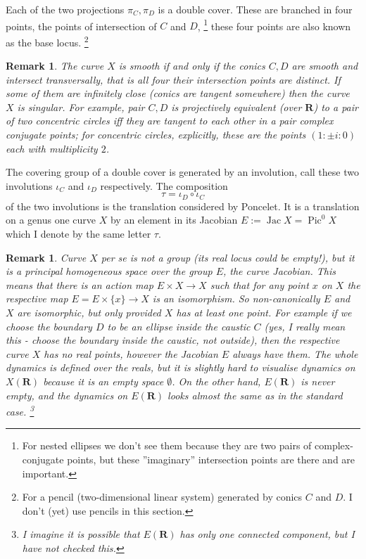 \documentclass[12pt]{article}
\numberwithin{equation}{section}
\newtheorem{remark}[dummy]{Remark}           %
\newcommand\R{\mathbf{R}}                    %
\DeclareMathOperator\Jac{Jac}		     %
\DeclareMathOperator\Pic{Pic}                %
\begin{document}
Each of the two projections $π_C,π_D$ is a double cover.
These are branched in four points,
the points of intersection of $C$ and $D$,
\footnote{For nested ellipses we don’t see them
because they are two pairs of complex-conjugate points,
but these ''imaginary'' intersection points are there and are important.}
these four points are also known as the base locus.
\footnote{For a pencil (two-dimensional linear system) 
generated by conics $C$ and $D$.
I don't (yet) use pencils in this section.}

\begin{remark} The curve $X$ is smooth if and only if
the conics $C,D$ are smooth \emph{and intersect transversally}, that is
all four their intersection points are distinct.
If some of them are infinitely close (conics are tangent somewhere)
then the curve $X$ is singular.
For example, pair $C,D$ is projectively equivalent (over $\R$)
to a pair of two concentric circles
iff they are tangent to each other in a pair complex conjugate points;
for concentric circles, explicitly,
these are the points $(1:\pm i:0)$ each with multiplicity $2$.
\end{remark}

The covering group of a double cover is generated by an involution,
call these two involutions $ι_C$ and $ι_D$ respectively.
The composition 
\begin{equation} \label{def:tau}
   τ = ι_D \circ ι_C
\end{equation}
of the two involutions is the translation considered by Poncelet.
It is a translation on a genus one curve $Χ$ 
by an element in its Jacobian $Ε := \Jac X = \Pic^0 X$
which I denote by the same letter $τ$.

\begin{remark} Curve $X$ per se is not a group (its real locus could be empty!),
but it is a principal homogeneous space over the group $E$, the curve Jacobian.
This means that there is an action map $E \times X \to X$
such that for any point $x$ on $X$ the respective map $E = E \times \{x\} \to X$
is an isomorphism. So non-canonically $E$ and $X$ are isomorphic,
but only provided $X$ has at least one point.
For example if we choose the boundary $D$ to be an ellipse inside the caustic $C$
(yes, I really mean this - \emph{choose the boundary inside the caustic, not outside}),
then the respective curve $X$ has no real points,
however the Jacobian $E$ always have them.
The whole dynamics is defined over the reals,
but it is slightly hard to visualise dynamics on $X(\R)$ because it is an empty space $\emptyset$.
On the other hand, $E(\R)$ is never empty,
and the dynamics on $E(\R)$
looks almost the same as in the standard case.
\footnote{I imagine it is possible that $E(\R)$ has only one connected component,
but I have not checked this.}
\end{remark}
\end{document}
